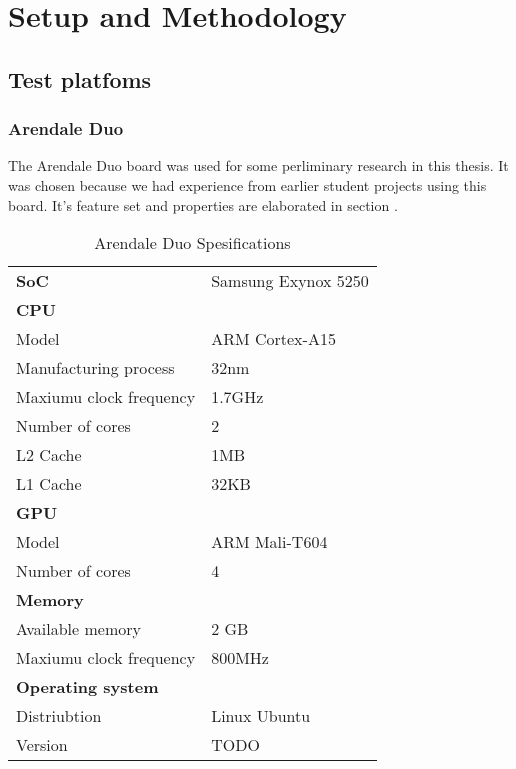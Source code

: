 \chapter[Setup and Methodology]{Setup and Methodology}

\section{Test platfoms}

\subsection{Arendale Duo}
The Arendale Duo board was used for some perliminary research in this thesis.
It was chosen because we had experience from earlier student projects using this board.
It's feature set and properties are elaborated in section .
\begin{table}[h]
  \begin{tabular}{ll}
    \textbf{SoC}              & Samsung Exynox 5250 \\
    \textbf{CPU}              &  \\
    Model                     & ARM Cortex-A15 \\
    Manufacturing process     & 32nm \\
    Maxiumu clock frequency   & 1.7GHz \\
    Number of cores           & 2 \\
    L2 Cache                  & 1MB \\
    L1 Cache                  & 32KB \\
    \textbf{GPU}              &  \\
    Model                     & ARM Mali-T604 \\
    Number of cores           & 4 \\
    \textbf{Memory}           &  \\
    Available memory          & 2 GB \\
    Maxiumu clock frequency   & 800MHz \\
    \textbf{Operating system} &  \\
    Distriubtion              & Linux Ubuntu \\
    Version                   & TODO
  \end{tabular}
  \caption{Arendale Duo Spesifications\label{overflow}}
\end{table}
